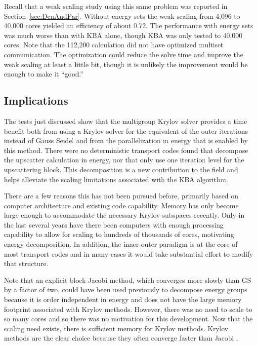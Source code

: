 Recall that a weak scaling study using this same problem was reported in Section~\ref{sec:DenAndPar}. Without energy sets the weak scaling from 4,096 to 40,000 cores yielded an efficiency of about 0.72. The performance with energy sets was much worse than with KBA alone, though KBA was only tested to 40,000 cores. Note that the 112,200 calculation did not have optimized multiset communication. The optimization could reduce the solve time and improve the weak scaling at least a little bit, though it is unlikely the improvement would be enough to make it ``good.''
%

\subsection{Implications}
The tests just discussed show that the multigroup Krylov solver provides a time benefit both from using a Krylov solver for the equivalent of the outer iterations instead of Gauss Seidel and from the parallelization in energy that is enabled by this method. There were no deterministic transport codes found that decompose the upscatter calculation in energy, nor that only use one iteration level for the upscattering block. This decomposition is a new contribution to the field and helps alleviate the scaling limitations associated with the KBA algorithm.   

There are a few reasons this has not been pursued before, primarily based on computer architecture and existing code capability. Memory has only become large enough to accommodate the necessary Krylov subspaces recently. Only in the last several years have there been computers with enough processing capability to allow for scaling to hundreds of thousands of cores, motivating energy decomposition. In addition, the inner-outer paradigm is at the core of most transport codes and in many cases it would take substantial effort to modify that structure. 

Note that an explicit block Jacobi method, which converges more slowly than GS by a factor of two, could have been used previously to decompose energy groups because it is order independent in energy and does not have the large memory footprint associated with Krylov methods. However, there was no need to scale to so many cores and so there was no motivation for this development. Now that the scaling need exists, there is sufficient memory for Krylov methods. Krylov methods are the clear choice because they often converge faster than Jacobi \cite{LeVeque2007}. 

